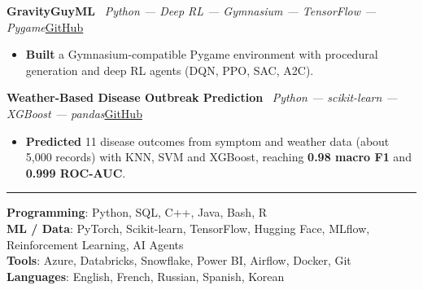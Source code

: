 \documentclass[a4paper,10pt]{article}
\newcommand{\sep}{\textbar\ }
\newcommand{\cvsection}[1]{\vspace{0.55em}\noindent{\textbf{\MakeUppercase{#1}}}\par\vspace{-0.4em}\noindent\rule{\linewidth}{0.4pt}\par\vspace{0.25em}}
\newcommand{\cvrow}[2]{\noindent #1\hfill #2\par}
\newenvironment{cvlist}{\begin{itemize}[leftmargin=1.1em,itemsep=0pt,topsep=1pt,parsep=0pt,partopsep=0pt,label=\textbullet]}{\end{itemize}\vspace{0.3em}}
\begin{document}
\cvrow{\textbf{GravityGuyML} \sep \textit{Python --- Deep RL --- Gymnasium --- TensorFlow --- Pygame}}{\href{https://github.com/Mbaka11/Gravity-Guy-ML}{GitHub}}
\begin{cvlist}
  \item \textbf{Built} a Gymnasium-compatible Pygame environment with procedural generation and deep RL agents (DQN, PPO, SAC, A2C).
\end{cvlist}

\cvrow{\textbf{Weather-Based Disease Outbreak Prediction} \sep \textit{Python --- scikit-learn --- XGBoost --- pandas}}{\href{https://github.com/Mbaka11/20251R0136COSE47101}{GitHub}}
\begin{cvlist}
  \item \textbf{Predicted} 11 disease outcomes from symptom and weather data (about 5,000 records) with KNN, SVM and XGBoost, reaching \textbf{0.98 macro F1} and \textbf{0.999 ROC-AUC}.
\end{cvlist}

\cvsection{Skills}
\textbf{Programming}: Python, SQL, C++, Java, Bash, R\\
\textbf{ML / Data}: PyTorch, Scikit-learn, TensorFlow, Hugging Face, MLflow, Reinforcement Learning, AI Agents\\
\textbf{Tools}: Azure, Databricks, Snowflake, Power BI, Airflow, Docker, Git\\
\textbf{Languages}: English, French, Russian, Spanish, Korean
\end{document}

